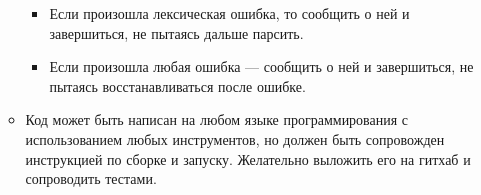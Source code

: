 \documentclass[12pt]{article}
\begin{document}
\begin{itemize}
\begin{itemize}
        \begin{itemize}
          \item Если произошла лексическая ошибка, то сообщить о ней и завершиться, не пытаясь дальше парсить.
          \item Если произошла любая ошибка --- сообщить о ней и завершиться, не пытаясь восстанавливаться после ошибке.
        \end{itemize}
        \item Код может быть написан на любом языке программирования с использованием любых инструментов, но должен быть сопровожден инструкцией по сборке и запуску. Желательно выложить его на гитхаб и сопроводить тестами.
      \end{itemize}

    \end{itemize}
\end{document}
